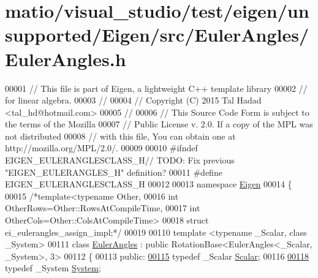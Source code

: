 \hypertarget{matio_2visual__studio_2test_2eigen_2unsupported_2_eigen_2src_2_euler_angles_2_euler_angles_8h_source}{}\section{matio/visual\+\_\+studio/test/eigen/unsupported/\+Eigen/src/\+Euler\+Angles/\+Euler\+Angles.h}
\label{matio_2visual__studio_2test_2eigen_2unsupported_2_eigen_2src_2_euler_angles_2_euler_angles_8h_source}

\begin{DoxyCode}
00001 \textcolor{comment}{// This file is part of Eigen, a lightweight C++ template library}
00002 \textcolor{comment}{// for linear algebra.}
00003 \textcolor{comment}{//}
00004 \textcolor{comment}{// Copyright (C) 2015 Tal Hadad <tal\_hd@hotmail.com>}
00005 \textcolor{comment}{//}
00006 \textcolor{comment}{// This Source Code Form is subject to the terms of the Mozilla}
00007 \textcolor{comment}{// Public License v. 2.0. If a copy of the MPL was not distributed}
00008 \textcolor{comment}{// with this file, You can obtain one at http://mozilla.org/MPL/2.0/.}
00009 
00010 \textcolor{preprocessor}{#ifndef EIGEN\_EULERANGLESCLASS\_H// TODO: Fix previous "EIGEN\_EULERANGLES\_H" definition?}
00011 \textcolor{preprocessor}{#define EIGEN\_EULERANGLESCLASS\_H}
00012 
00013 \textcolor{keyword}{namespace }\hyperlink{namespace_eigen}{Eigen}
00014 \{
00015   \textcolor{comment}{/*template<typename Other,}
00016 \textcolor{comment}{         int OtherRows=Other::RowsAtCompileTime,}
00017 \textcolor{comment}{         int OtherCols=Other::ColsAtCompileTime>}
00018 \textcolor{comment}{  struct ei\_eulerangles\_assign\_impl;*/}
00019 
00110   \textcolor{keyword}{template} <\textcolor{keyword}{typename} \_Scalar, \textcolor{keyword}{class} \_System>
00111   \textcolor{keyword}{class }\hyperlink{class_euler_angles}{EulerAngles} : \textcolor{keyword}{public} RotationBase<EulerAngles<\_Scalar, \_System>, 3>
00112   \{
00113     \textcolor{keyword}{public}:
\hyperlink{class_eigen_1_1_euler_angles_a2ab1d433ac9683268446f8905ac31aac}{00115}       \textcolor{keyword}{typedef} \_Scalar \hyperlink{class_eigen_1_1_euler_angles_a2ab1d433ac9683268446f8905ac31aac}{Scalar};
00116       
\hyperlink{class_eigen_1_1_euler_angles_a17e3dee5fef4af35bbb4e319c2cdc3c1}{00118}       \textcolor{keyword}{typedef} \_System \hyperlink{class_eigen_1_1_euler_angles_a17e3dee5fef4af35bbb4e319c2cdc3c1}{System};

\end{DoxyCode}
